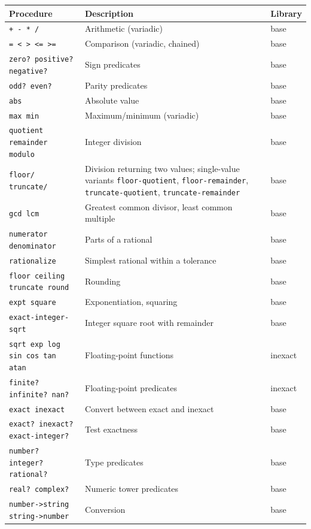 \begin{center}
\small
\begin{tabularx}{\textwidth}{@{}lYl@{}}
\textbf{Procedure} & \textbf{Description} & \textbf{Library} \\
\hline
\texttt{+ - * /} & Arithmetic (variadic) & base \\
\texttt{= < > <= >=} & Comparison (variadic, chained) & base \\
\texttt{zero? positive? negative?} & Sign predicates & base \\
\texttt{odd? even?} & Parity predicates & base \\
\texttt{abs} & Absolute value & base \\
\texttt{max min} & Maximum/minimum (variadic) & base \\
\texttt{quotient remainder modulo} & Integer division & base \\
\texttt{floor/ truncate/} & Division returning two values; single-value variants \texttt{floor-quotient}, \texttt{floor-remainder}, \texttt{truncate-quotient}, \texttt{truncate-remainder} & base \\
\texttt{gcd lcm} & Greatest common divisor, least common multiple & base \\
\texttt{numerator denominator} & Parts of a rational & base \\
\texttt{rationalize} & Simplest rational within a tolerance & base \\
\texttt{floor ceiling truncate round} & Rounding & base \\
\texttt{expt square} & Exponentiation, squaring & base \\
\texttt{exact-integer-sqrt} & Integer square root with remainder & base \\
\texttt{sqrt exp log sin cos tan atan} & Floating-point functions & inexact \\
\texttt{finite? infinite? nan?} & Floating-point predicates & inexact \\
\texttt{exact inexact} & Convert between exact and inexact & base \\
\texttt{exact? inexact? exact-integer?} & Test exactness & base \\
\texttt{number? integer? rational?} & Type predicates & base \\
\texttt{real? complex?} & Numeric tower predicates & base \\
\texttt{number->string string->number} & Conversion & base \\
\end{tabularx}
\end{center}

